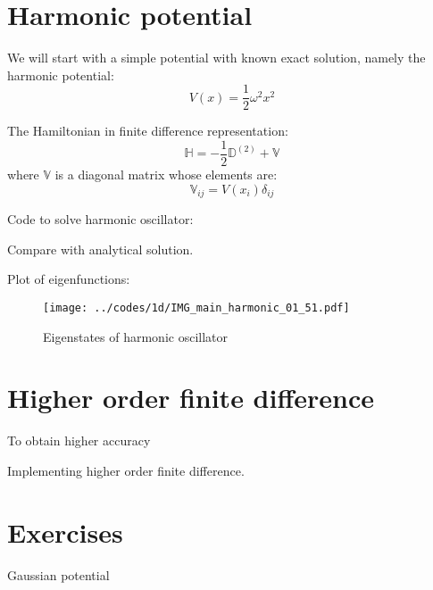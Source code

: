 \section{Harmonic potential}

We will start with a simple potential with known exact solution, namely the harmonic potential:
\begin{equation}
V(x) = \frac{1}{2}\omega^2 x^2
\end{equation}

The Hamiltonian in finite difference representation:
\begin{equation}
\mathbb{H} = -\frac{1}{2}\mathbb{D}^{(2)} + \mathbb{V}
\end{equation}
where $\mathbb{V}$ is a diagonal matrix whose elements are:
\begin{equation}
\mathbb{V}_{ij} = V(x_{i})\delta_{ij}
\end{equation}


Code to solve harmonic oscillator:


Compare with analytical solution.

Plot of eigenfunctions:

\begin{figure}[H]
{\center
\texttt{[image: ../codes/1d/IMG\_main\_harmonic\_01\_51.pdf]}
\par}
\caption{Eigenstates of harmonic oscillator}
\end{figure}


\section{Higher order finite difference}

To obtain higher accuracy

Implementing higher order finite difference.


\section{Exercises}

Gaussian potential

